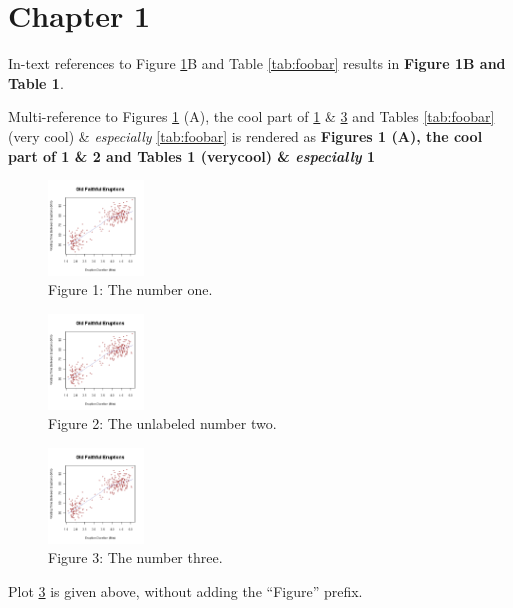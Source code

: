 \hypertarget{chapter-1}{%
\section{Chapter 1}\label{chapter-1}}

In-text references to Figure \ref{fig:1}B and Table \ref{tab:foobar}
results in \textbf{Figure 1B and Table 1}.

Multi-reference to Figures \ref{fig:1} (A), the cool part of
\ref{fig:1} \& \ref{fig:three} and Tables \ref{tab:foobar} (very
cool) \& \emph{especially} \ref{tab:foobar} is rendered as
\textbf{Figures 1 (A), the cool part of 1 \& 2 and Tables 1 (verycool)
\& \emph{especially} 1}

\begin{figure}
\hypertarget{fig:1}{%
\centering
\includegraphics[width=1in,height=\textheight]{img/fig-1.png}
\caption{Figure 1: The number one.}\label{fig:1}
}
\end{figure}

\begin{figure}
\hypertarget{fig:}{%
\centering
\includegraphics[width=1in,height=\textheight]{img/fig-1.png}
\caption{Figure 2: The unlabeled number two.}\label{fig:}
}
\end{figure}

\begin{figure}
\hypertarget{fig:three}{%
\centering
\includegraphics[width=1in,height=\textheight]{img/fig-1.png}
\caption{Figure 3: The number three.}\label{fig:three}
}
\end{figure}

Plot \ref{fig:three} is given above, without adding the ``Figure''
prefix.

